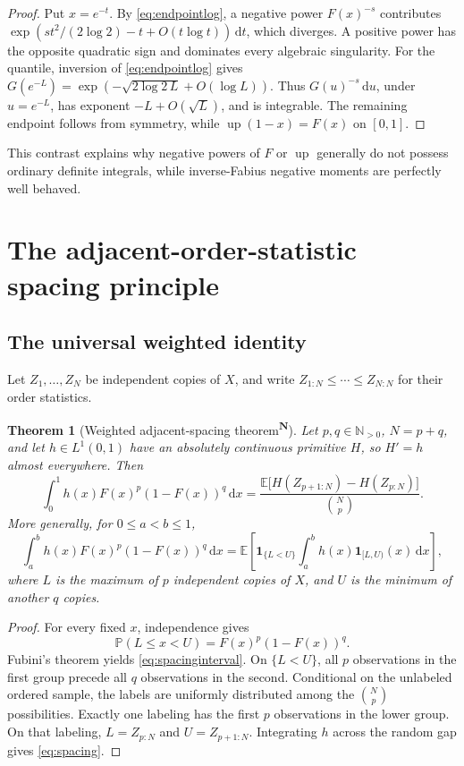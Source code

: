 \documentclass[11pt,oneside]{article}
\newtheorem{theorem}{Theorem}[section]
\theoremstyle{definition}
\theoremstyle{remark}
\newcommand{\F}{F}
\newcommand{\G}{G}
\newcommand{\Up}{\operatorname{up}}
\newcommand{\E}{\mathbb E}
\newcommand{\Pp}{\mathbb P}
\newcommand{\N}{\mathbb N}
\newcommand{\dd}{\,\mathrm d}
\newcommand{\tagnew}{\textsuperscript{\textcolor{oliveink}{\bfseries N}}}
\begin{document}
\begin{proof}
Put \(x=e^{-t}\).  By \eqref{eq:endpointlog}, a negative power
\(\F(x)^{-s}\) contributes
\(\exp(s t^2/(2\log2)-t+O(t\log t))\dd t\), which diverges.  A positive power
has the opposite quadratic sign and dominates every algebraic singularity.
For the quantile, inversion of \eqref{eq:endpointlog} gives
\(
 \G(e^{-L})=\exp(-\sqrt{2\log2\,L}+O(\log L))
\).
Thus \(\G(u)^{-s}\dd u\), under \(u=e^{-L}\), has exponent
\(-L+O(\sqrt L)\), and is integrable.  The remaining endpoint follows from
symmetry, while \(\Up(1-x)=\F(x)\) on \([0,1]\).
\end{proof}

This contrast explains why negative powers of \(\F\) or \(\Up\) generally do
not possess ordinary definite integrals, while inverse-Fabius negative moments
are perfectly well behaved.

\section{The adjacent-order-statistic spacing principle}

\subsection{The universal weighted identity}

Let \(Z_1,\ldots,Z_N\) be independent copies of \(X\), and write
\(Z_{1:N}\le\cdots\le Z_{N:N}\) for their order statistics.

\begin{theorem}[Weighted adjacent-spacing theorem\tagnew]\label{thm:spacing}
Let \(p,q\in\N_{>0}\), \(N=p+q\), and let \(h\in L^1(0,1)\) have an absolutely
continuous primitive \(H\), so \(H'=h\) almost everywhere.  Then
\begin{equation}\label{eq:spacing}
 \boxed{
 \int_0^1h(x)\F(x)^p(1-\F(x))^q\dd x
 =\frac{\E\bigl[H(Z_{p+1:N})-H(Z_{p:N})\bigr]}
        {\binom{N}{p}}.}
\end{equation}
More generally, for \(0\le a<b\le1\),
\begin{equation}\label{eq:spacinginterval}
 \int_a^b h(x)\F(x)^p(1-\F(x))^q\dd x
 =\E\!\left[
 \mathbf1_{\{L<U\}}
 \int_a^b h(x)\mathbf1_{[L,U)}(x)\dd x\right],
\end{equation}
where \(L\) is the maximum of \(p\) independent copies of \(X\), and \(U\)
is the minimum of another \(q\) copies.
\end{theorem}

\begin{proof}
For every fixed \(x\), independence gives
\[
 \Pp(L\le x<U)=\F(x)^p(1-\F(x))^q.
\]
Fubini's theorem yields \eqref{eq:spacinginterval}.  On \(\{L<U\}\), all
\(p\) observations in the first group precede all \(q\) observations in the
second.  Conditional on the unlabeled ordered sample, the labels are uniformly
distributed among the \(\binom Np\) possibilities.  Exactly one labeling has
the first \(p\) observations in the lower group.  On that labeling,
\(L=Z_{p:N}\) and \(U=Z_{p+1:N}\).  Integrating \(h\) across the random gap
gives \eqref{eq:spacing}.
\end{proof}
\end{document}
